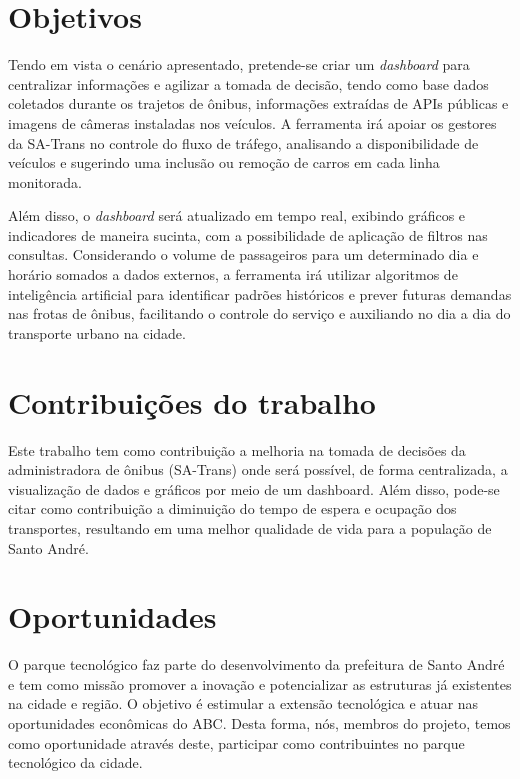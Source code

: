 \section{Objetivos}
\indent
\par Tendo em vista o cenário apresentado, pretende-se criar um \textit{dashboard} para centralizar informações e agilizar a tomada de decisão, tendo como base dados coletados durante os trajetos de ônibus, informações extraídas de APIs públicas e imagens de câmeras instaladas nos veículos. A ferramenta irá apoiar os gestores da SA-Trans no controle do fluxo de tráfego, analisando a disponibilidade de veículos e sugerindo uma inclusão ou remoção de carros em cada linha monitorada.
\par Além disso, o \textit{dashboard} será atualizado em tempo real, exibindo gráficos e indicadores de maneira sucinta, com a possibilidade de aplicação de filtros nas consultas. Considerando o volume de passageiros para um determinado dia e horário somados a dados externos, a ferramenta irá utilizar algoritmos de inteligência artificial para identificar padrões históricos e prever futuras demandas nas frotas de ônibus, facilitando o controle do serviço e auxiliando no dia a dia do transporte urbano na cidade.


\section{Contribuições do trabalho}
\indent
\par Este trabalho tem como contribuição a melhoria na tomada de decisões da administradora de ônibus (SA-Trans) onde será possível, de forma centralizada, a visualização de dados e gráficos por meio de um dashboard. Além disso, pode-se citar como contribuição a diminuição do tempo de espera e ocupação dos transportes, resultando em uma melhor qualidade de vida para a população de Santo André.

\section{Oportunidades}
\indent
\par O parque tecnológico faz parte do desenvolvimento da prefeitura de Santo André e tem como missão promover a inovação e potencializar as estruturas já existentes na cidade e região. O objetivo é estimular a extensão tecnológica e atuar nas oportunidades econômicas do ABC.
Desta forma, nós, membros do projeto, temos como oportunidade através deste, participar como contribuintes no parque tecnológico da cidade.

